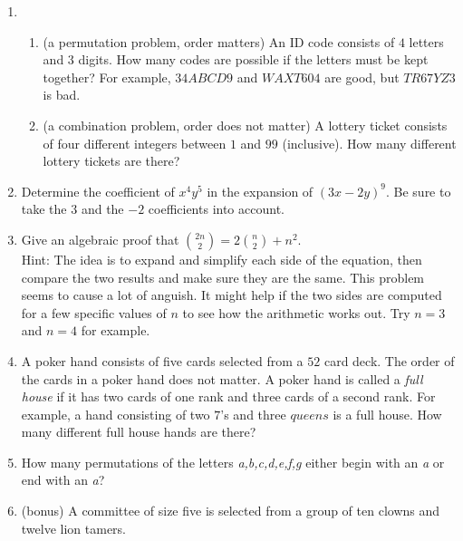 \documentclass[11pt]{amsart}
\begin{document}
\begin{enumerate}


\item 
\begin{enumerate}
\item (a permutation problem, order matters) An ID code consists of $4$  letters and $3$  digits. How many codes are possible if the letters must be kept together? For example, $34ABCD9$
and $WAXT604$ are good, but $TR67YZ3$ is bad.\\[3pt]
\item (a combination problem, order does not matter) A lottery ticket consists of four different integers between $1$ and $99$ (inclusive). How many different lottery tickets are there?\\[5pt]
\end{enumerate}

\item Determine the coefficient of  $x^4y^5$ in the expansion of $(3x-2y)^9$. Be sure to 
take the $3$ and the $-2$ coefficients into account.\\[5pt]

\item    Give an algebraic proof that $\displaystyle {{2n}\choose 2} = 2{n\choose 2} + n^2$.\\[3pt]
Hint: The idea is to expand and simplify each side of the equation, then compare the two results and make sure they are the same. This problem seems to cause a lot of anguish. It might help if the two sides are computed for a few specific values of $n$ to see how the arithmetic works out. Try $n = 3$ and $n=4$ for example.\\[5pt]

\item A poker hand consists of five cards selected from a $52$ card deck. The order of the cards in a poker hand does not matter. A poker hand is called a {\it full house} if it has two cards of one rank and three cards of a second rank. For example, a hand consisting of two $7$'s and three $queens$ is a full house. How many different full house hands are there?\\[5pt] 

\item How many permutations of the letters {\it a,b,c,d,e,f,g} either begin with an {\it a} or end with an {\it a}?\\[5pt]


\item (bonus) A committee of size five is selected from a group of ten clowns and
twelve  lion tamers.\\[3pt]


\end{enumerate}
\end{document}
